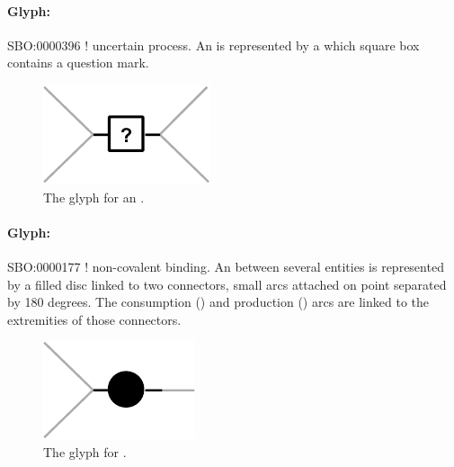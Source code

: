 \paragraph{Glyph: }\label{sec:techref:uncertain}

\begin{glyphDescription}
 \glyphSboTerm SBO:0000396 ! uncertain process.
 \glyphNode An  is represented by a  which square box contains a question mark.
 \end{glyphDescription}

\begin{figure}[htb]
  \centering
  \includegraphics[scale = 0.5]{images/uncertain}
  \caption{The \PD glyph for an .}
  \label{fig:techref:uncertain}
\end{figure}



\paragraph{Glyph: }\label{sec:techref:association}


\begin{glyphDescription}
 \glyphSboTerm SBO:0000177 ! non-covalent binding.
 \glyphNode An  between several entities is represented by a filled disc linked to two connectors, small arcs attached on point separated by 180 degrees. The consumption () and production () arcs are linked to the extremities of those connectors.
 \end{glyphDescription}

\begin{figure}[htb]
  \centering
  \includegraphics[scale = 0.5]{images/association}
  \caption{The \PD glyph for .}
  \label{fig:techref:association}
\end{figure}


